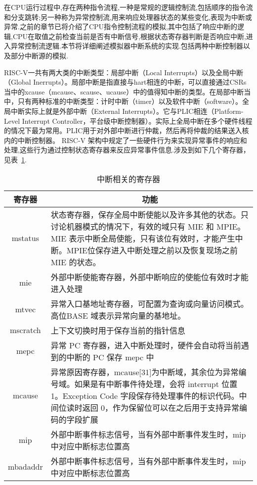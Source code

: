 在CPU运行过程中,存在两种指令流程,一种是常规的逻辑控制流,包括顺序的指令流和分支跳转;另一种称为异常控制流,用来响应处理器状态的某些变化,表现为中断或异常.之前的章节已将介绍了CPU指令控制流程的模拟,其中包括了响应中断的逻辑,CPU在取值之前检查当前是否有中断信号,根据状态寄存器判断是否响应中断,进入异常控制流逻辑.本节将详细阐述模拟器中断系统的实现.包括两种中断控制器以及部分中断源的模拟.


RISC-V一共有两大类的中断类型：局部中断（Local Interrupts）以及全局中断（Global Inerrupts）。局部中断是指直接与hart相连的中断，可以直接通过CSRs当中的xcause（mcause、scause、ucause）中的值得知中断的类型。在局部中断当中，只有两种标准的中断类型：计时中断（timer）以及软件中断（software）。全局中断实际上就是外部中断（External Interrupts）。它与PLIC相连（Platform-Level Interrupt Controller，平台级中断控制器）。实际上全局中断在多个硬件线程的情况下最为常用。PLIC用于对外部中断进行仲裁，然后再将仲裁的结果送入核内的中断控制器。
RISC-V 架构中规定了一些硬件行为来实现异常事件的响应和处理,这些行为通过控制状态寄存器来反应异常事件信息.涉及到如下几个寄存器，见表~\ref{tab:csr}.
\begin{table}[h]
  \centering
  \caption{中断相关的寄存器}
  \label{tab:csr}
  \begin{tabular}{cl}
    \toprule
寄存器	& \multicolumn{1}{c}{功能}\\
    \midrule
    mstatus	& \multicolumn{1}{m{9cm}}{状态寄存器，保存全局中断使能以及许多其他的状态。只讨论机器模式的情况下，有效的域只有 MIE 和 MPIE。MIE 表示中断全局使能，只有该位有效时，才能产生中断。MPIE位保存进入中断处理之前以及恢复现场之前 MIE 的状态。}\\ \hline
    mie	& \multicolumn{1}{m{9cm}}{外部中断使能寄存器，外部中断响应的使能位有效时才能进入处理}\\ \hline
    mtvec	& \multicolumn{1}{m{9cm}}{异常入口基地址寄存器，可配置为查询或向量访问模式。高位BASE 域表示异常向量的基地址。}\\ \hline
    mscratch & \multicolumn{1}{m{9cm}}{上下文切换时用于保存当前的指针信息}\\ \hline
    mepc & \multicolumn{1}{m{9cm}}{异常 PC 寄存器，进入中断处理时，硬件会自动将当前遇到的中断的 PC 保存 mepc 中}\\ \hline
    mcause & \multicolumn{1}{m{9cm}}{异常原因寄存器，mcause[31]为中断域，其余位为异常编号域。如果是有中断事件待处理，会将 interrupt 位置 1。Exception Code 字段保存待处理事件的标识代码。中间位读时返回 0，作为保留位可以在之后用于支持异常编码的字段扩展}\\ \hline
    mip	& \multicolumn{1}{m{9cm}}{外部中断事件标志信号，当有外部中断事件发生时，mip中对应中断标志位置高}\\ \hline
    mbadaddr & \multicolumn{1}{m{9cm}}{外部中断事件标志信号，当有外部中断事件发生时，mip中对应中断标志位置高}\\
    \bottomrule
  \end{tabular}
\end{table}


